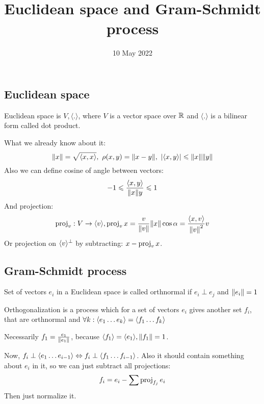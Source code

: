 
\title{Euclidean space and Gram-Schmidt process}
\author{}
\date{10 May 2022}


\maketitle

\subsection*{Euclidean space}

\begin{df} Euclidean space is $V, \langle . \rangle$, where
    $V$ is a vector space over $\mathbb R$ and $\langle . \rangle$ is a bilinear form
    called dot product. \end{df}

What we already know about it:
\[
    \norm{x} = \sqrt{\langle x, x \rangle},\
    \rho(x, y) = \norm{x - y},\
    |\langle x, y \rangle| \leqslant \norm{x}\norm{y} \]
Also we can define cosine of angle between vectors:
\[ -1 \leqslant \frac{\langle x, y \rangle}{\norm{x}{y}} \leqslant 1 \]
And projection:
\[ \operatorname{proj}_{v}: V \to \langle v \rangle, \operatorname{proj}_{v}{x} = \frac{v}{\norm{v}} \norm{x} \cos \alpha =
    \frac{\langle x, v \rangle}{\norm{v}^2} v \]
Or projection on $\langle v \rangle^\perp$ by subtracting: $x - \operatorname{proj}_vx$.

\subsection*{Gram-Schmidt process}

\begin{df} Set of vectors $e_i$ in a Euclidean space
    is called orthnormal if $e_i \perp e_j$ and $\norm{e_i} = 1$ \end{df}

\begin{df} Orthogonalization is a process which for a set of vectors
    $e_i$ gives another set $f_i$, that are orthnormal and
    $\forall k: \langle e_1 \dots e_k \rangle = \langle f_1 \dots f_k \rangle$ \end{df}

Necessarily $f_1 = \frac{e_1}{\norm{e_1}}$, because 
$\langle f_1 \rangle = \langle e_1 \rangle, \norm{f_1} = 1$.

Now, $f_i \perp \langle e_1\dots e_{i-1} \rangle \Leftrightarrow f_i \perp \langle f_1 \dots f_{i-1} \rangle$.
Also it should contain something about $e_i$ in it, so we can just subtract all projections: 
\[f_i = e_i - \sum \operatorname{proj}_{f_j}{e_i}\]
Then just normalize it.

